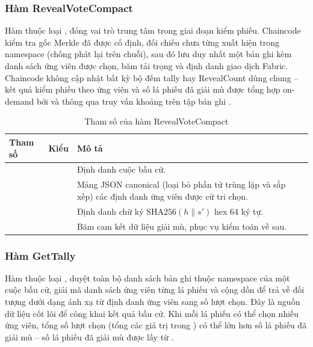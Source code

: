 \subsubsection{Hàm RevealVoteCompact}

Hàm  thuộc loại , đóng vai trò trung tâm trong giai đoạn kiểm phiếu. Chaincode kiểm tra gốc Merkle đã được cố định, đối chiếu  chưa từng xuất hiện trong namespace  (chống phát lại trên chuỗi), sau đó lưu duy nhất một bản ghi  kèm danh sách ứng viên được chọn, băm tải trọng và định danh giao dịch Fabric. Chaincode không cập nhật bất kỳ bộ đếm tally hay RevealCount dùng chung -- kết quả kiểm phiếu theo ứng viên và số lá phiếu đã giải mù được tổng hợp on-demand bởi  và  thông qua truy vấn khoảng trên tập bản ghi .

\begin{table}[H]
    \centering
    \small
    \setlength{\tabcolsep}{3pt}
    \caption{Tham số của hàm RevealVoteCompact}
    \label{tab:cc-revealvotecompact}
    \begin{tabularx}{\textwidth}{|L{0.25}|L{0.25}|L{0.50}|}
    \hline
    \textbf{Tham số} & \textbf{Kiểu} & \textbf{Mô tả} \\
    \hline
            &  & Định danh cuộc bầu cử. \\ \hline
      &  & Mảng JSON canonical (loại bỏ phần tử trùng lặp và sắp xếp) các định danh ứng viên được cử tri chọn. \\ \hline
             &  & Định danh chữ ký $\mathrm{SHA256}(h \mathbin{\|} s')$ hex 64 ký tự. \\ \hline
     &  & Băm cam kết dữ liệu giải mù, phục vụ kiểm toán về sau. \\ \hline
    \end{tabularx}
\end{table}

\subsubsection{Hàm GetTally}

Hàm  thuộc loại , duyệt toàn bộ danh sách bản ghi thuộc namespace  của một cuộc bầu cử, giải mã danh sách ứng viên từng lá phiếu và cộng dồn để trả về đối tượng  dưới dạng ánh xạ từ định danh ứng viên sang số lượt chọn. Đây là nguồn dữ liệu cốt lõi để công khai kết quả bầu cử. Khi mỗi lá phiếu có thể chọn nhiều ứng viên, tổng số lượt chọn (tổng các giá trị trong ) có thể lớn hơn số lá phiếu đã giải mù -- số lá phiếu đã giải mù được lấy từ .

